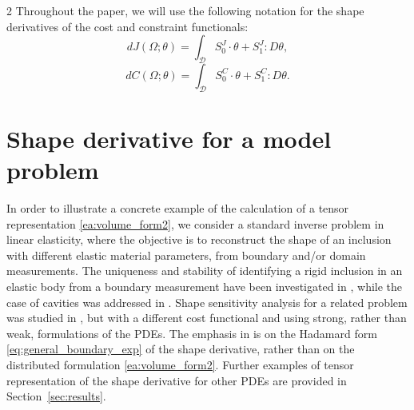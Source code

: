 \documentclass[a4paper, oneside]{article}
\newcommand{\VV}{\theta}
\begin{document}
\begin{multicols}{2}
Throughout the paper, we will use the following notation for the shape derivatives of the cost and constraint functionals:
	\begin{equation}\label{dJ1}
		dJ(\Omega;\VV) = \int_{\mathcal{D}} S_0^J \cdot \theta + S_1^J : D\theta, 
	\end{equation}
	\begin{equation}\label{dC1}
		dC(\Omega;\VV) = \int_{\mathcal{D}} S_0^C \cdot \theta + S_1^C : D\theta .
	\end{equation}

\section{Shape derivative for a model problem}
\label{sec:model_prob}

In order to illustrate a concrete example of the calculation of a tensor representation \eqref{ea:volume_form2}, we consider a standard inverse problem in linear elasticity, where the objective is to reconstruct the shape of an inclusion with different elastic material parameters, from boundary and/or domain measurements.
The uniqueness and stability of identifying a rigid inclusion in an elastic body from a boundary measurement have been investigated in \cite{Morassi2009}, while the case of cavities was addressed in \cite{MR1772729}.
Shape sensitivity analysis for a related problem was studied in \cite{MEFTAHI20151554}, but with a different cost functional and using strong, rather than weak, formulations of the PDEs. The emphasis in \cite{MEFTAHI20151554} is on the Hadamard form \eqref{eq:general_boundary_exp} of the shape derivative, rather than on the distributed formulation \eqref{ea:volume_form2}.
Further examples of tensor representation of the shape derivative for other PDEs are provided in Section~\ref{sec:results}.


\end{multicols}
\end{document}

